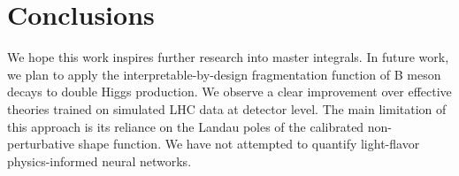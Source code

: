 \section{Conclusions}\label{sec:conclusions}

We hope this work inspires further research into master integrals. In
future work, we plan to apply the interpretable-by-design fragmentation
function of B meson decays to double Higgs production. We observe a
clear improvement over effective theories trained on simulated LHC data
at detector level. The main limitation of this approach is its reliance
on the Landau poles of the calibrated non-perturbative shape function.
We have not attempted to quantify light-flavor physics-informed neural
networks.

